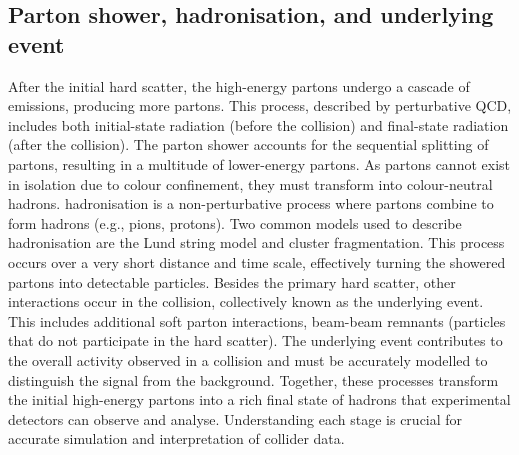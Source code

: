     \subsection{Parton shower, hadronisation, and underlying event}
        After the initial hard scatter, the high-energy partons undergo a cascade of emissions, producing more partons. 
        This process, described by perturbative QCD, includes both initial-state radiation (before the collision) and 
        final-state radiation (after the collision). The parton shower accounts for the sequential splitting of partons, 
        resulting in a multitude of lower-energy partons. 
        As partons cannot exist in isolation due to colour confinement, they must transform into colour-neutral hadrons. 
        hadronisation is a non-perturbative process where partons combine to form hadrons (e.g., pions, protons). 
        Two common models used to describe hadronisation are the Lund string model and cluster fragmentation. This 
        process occurs over a very short distance and time scale, effectively turning the showered partons into detectable 
        particles.
        Besides the primary hard scatter, other interactions occur in the collision, collectively known as the underlying event. 
        This includes additional soft parton interactions, beam-beam remnants (particles that do not participate in the hard scatter).
        The underlying event contributes to the overall activity observed in a collision 
        and must be accurately modelled to distinguish the signal from the background.
        Together, these processes transform the initial high-energy partons into a rich final state of hadrons that experimental 
        detectors can observe and analyse. Understanding each stage is crucial for accurate simulation and interpretation of collider data.